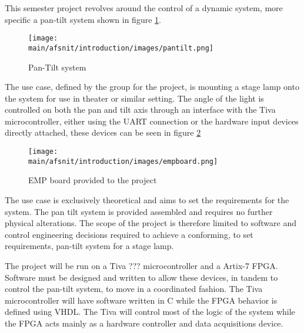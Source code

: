 \documentclass[../../main]{subfiles}
\begin{document}
This semester project revolves around the control of a dynamic system, more specific a pan-tilt  system shown in figure \ref{fig:system}.

\begin{figure}[H]
\centering
\texttt{[image: \\main/afsnit/introduction/images/pantilt.png]}
\caption{Pan-Tilt system}
\label{fig:system}
\end{figure}

The use case, defined by the group for the project, is mounting a stage lamp onto the system for use in theater or similar setting.
The angle of the light is controlled on both the pan and tilt axis through an interface with the Tiva microcontroller, either using the UART connection or the hardware input devices directly attached, these devices can be seen in figure \ref{fig:empboard}

\begin{figure}[H]
\texttt{[image: \\main/afsnit/introduction/images/empboard.png]}
\caption{EMP board provided to the project}
\label{fig:empboard}
\end{figure}

The use case is exclusively theoretical and aims to set the requirements for the system.
The pan tilt system is provided assembled and requires no further physical alterations. The scope of the project is therefore limited to software and control engineering decisions required to achieve a conforming, to set requirements, pan-tilt system for a stage lamp.

The project will be run on a Tiva ??? microcontroller and a Artix-7 FPGA. Software must be designed and written to allow these devices, in tandem to control the pan-tilt system, to move in a coordinated fashion.
The Tiva microcontroller will have software written in C while the FPGA behavior is defined using VHDL. The Tiva will control most of the logic of the system while the FPGA acts mainly as a hardware controller and data acquisitions device.
\end{document}
